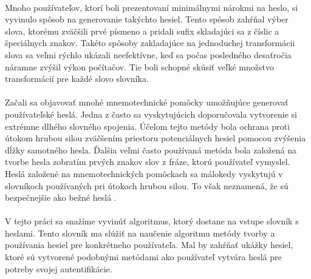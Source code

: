 \paragraph{}
Mnoho používateľov, ktorí boli prezentovaní minimálnymi nárokmi na heslo, si vyvinulo spôsob na generovanie takýchto hesiel. Tento spôsob zahŕňal výber slova, ktorému zväčšili prvé písmeno a pridali sufix skladajúci sa z číslic a špeciálnych znakov. Takéto spôsoby zakladajúce na jednoduchej transformácii slova sa veľmi rýchlo ukázali neefektívne, keď sa počas posledného desaťročia náramne zvýšil výkon počítačov. Tie boli schopné skúsiť veľké množstvo transformácií pre každé slovo slovníka.

\paragraph{}
Začali sa objavovať mnohé mnemotechnické pomôcky umožňujúce generovať používateľské heslá. Jedna z často sa vyskytujúcich doporučovala vytvorenie si extrémne dlhého slovného spojenia. Účelom tejto metódy bola ochrana proti útokom hrubou silou zväčšením priestoru potenciálnych hesiel pomocou zvýšenia dĺžky samotného hesla. Ďalšia veľmi často používaná metóda bola založená na tvorbe hesla zobratím prvých znakov slov z fráze, ktorú používateľ vymyslel. Heslá založené na mnemotechnických pomôckach sa málokedy vyskytujú v slovníkoch používaných pri útokoch hrubou silou. To však neznamená, že sú bezpečnejšie ako bežné heslá \cite{Kuo:2006:HSM:1143120.1143129}.

\paragraph{}
V tejto práci sa snažíme vyvinúť algoritmus, ktorý dostane na vstupe slovník s heslami. Tento slovník ma slúžiť na naučenie algoritmu metódy tvorby a používania hesiel pre konkrétneho používateľa. Mal by zahŕňať ukážky hesiel, ktoré sú vytvorené podobnými metódami ako používateľ vytvára heslá pre potreby svojej autentifikácie.